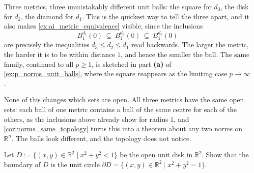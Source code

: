 \begin{remark}
\label{rem:unit_balls_distinguish_metrics}
Three metrics, three unmistakably different unit balls: the square for $d_3$, the disk for
$d_2$, the diamond for $d_1$. This is the quickest way to tell the three apart, and it also makes
\cref{ex:ai_metric_equivalence} visible, since the inclusions
\[B^{d_1}_1(0) \ \subseteq\ B^{d_2}_1(0) \ \subseteq\ B^{d_3}_1(0)\]
are precisely the inequalities $d_3 \leq d_2 \leq d_1$ read backwards. The larger the metric, the
harder it is to be within distance $1$, and hence the smaller the ball. The same family, continued
to all $p \geq 1$, is sketched in part \textbf{(a)} of \cref{ex:p_norms_unit_balls}, where the
square reappears as the limiting case $p \to \infty$.

None of this changes which sets are open. All three metrics have the same open sets: each ball of
one metric contains a ball of the same centre for each of the others, as the inclusions above
already show for radius $1$, and \cref{cor:norms_same_topology} turns this into a theorem about
any two norms on $\mathbb{R}^n$. The balls look different, and the topology does not notice.
\end{remark}




\begin{aiexercise}
\label{ex:ai_disk_boundary}
Let $D := \{(x,y) \in \mathbb{R}^2 \mid x^2 + y^2 < 1\}$ be the open unit disk in $\mathbb{R}^2$. Show that the boundary of $D$ is the unit circle $\partial D = \{(x,y) \in \mathbb{R}^2 \mid x^2 + y^2 = 1\}$.
\end{aiexercise}





